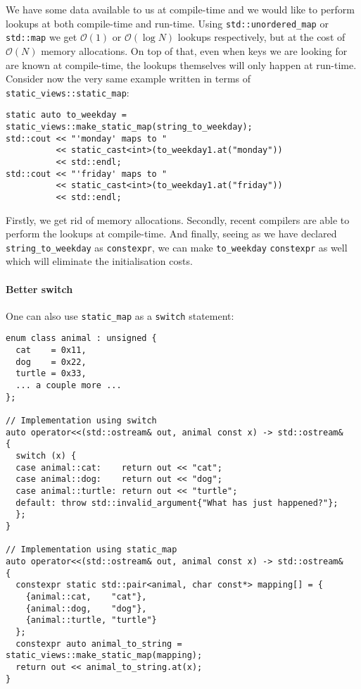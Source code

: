 \documentclass[a4paper,12pt]{article}
\begin{document}
    \noindent We have some data available to us at compile-time and we would
    like to perform lookups at both compile-time and run-time. Using
    \texttt{std::unordered\_map} or \texttt{std::map} we get $\mathcal{O}(1)$ or
    $\mathcal{O}(\log N)$ lookups respectively, but at the cost of
    $\mathcal{O}(N)$ memory allocations. On top of that, even when keys we are
    looking for are known at compile-time, the lookups themselves will only
    happen at run-time. Consider now the very same example written in terms of
    \texttt{static\_views::static\_map}:
\begin{spacing}{0.8}
\begin{lstlisting}
static auto to_weekday = static_views::make_static_map(string_to_weekday);
std::cout << "'monday' maps to "
          << static_cast<int>(to_weekday1.at("monday"))
          << std::endl;
std::cout << "'friday' maps to "
          << static_cast<int>(to_weekday1.at("friday"))
          << std::endl;
\end{lstlisting}
\end{spacing}
    \noindent Firstly, we get rid of memory allocations. Secondly, recent
    compilers are able to perform the lookups at compile-time. And finally,
    seeing as we have declared \texttt{string\_to\_weekday} as
    \texttt{constexpr}, we can make \texttt{to\_weekday} \texttt{constexpr} as
    well which will eliminate the initialisation costs.

    \paragraph{Better switch} One can also use \texttt{static\_map} as a
    \texttt{switch} statement:

\begin{spacing}{0.8}
\begin{lstlisting}
enum class animal : unsigned {
  cat    = 0x11,
  dog    = 0x22,
  turtle = 0x33,
  ... a couple more ...
};

// Implementation using switch
auto operator<<(std::ostream& out, animal const x) -> std::ostream&
{
  switch (x) {
  case animal::cat:    return out << "cat";
  case animal::dog:    return out << "dog";
  case animal::turtle: return out << "turtle";
  default: throw std::invalid_argument{"What has just happened?"};
  };
}

// Implementation using static_map
auto operator<<(std::ostream& out, animal const x) -> std::ostream&
{
  constexpr static std::pair<animal, char const*> mapping[] = {
    {animal::cat,    "cat"},
    {animal::dog,    "dog"},
    {animal::turtle, "turtle"}
  };
  constexpr auto animal_to_string = static_views::make_static_map(mapping);
  return out << animal_to_string.at(x);
}
\end{lstlisting}
\end{spacing}
\end{document}
